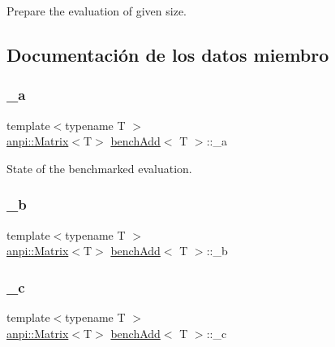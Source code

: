 Prepare the evaluation of given size. 



\subsection{Documentación de los datos miembro}
\mbox{\label{classbenchAdd_a133822bc19df3f71f9635d6e368ee592}} 
\subsubsection{\texorpdfstring{\+\_\+a}{\_a}}
{\footnotesize\ttfamily template$<$typename T $>$ \\
\hyperlink{classanpi_1_1Matrix}{anpi\+::\+Matrix}$<$T$>$ \hyperlink{classbenchAdd}{bench\+Add}$<$ T $>$\+::\+\_\+a\hspace{0.3cm}{\ttfamily [protected]}}



State of the benchmarked evaluation. 

\mbox{\label{classbenchAdd_a334aa4e387cd9964869af2a6f53882b1}} 
\subsubsection{\texorpdfstring{\+\_\+b}{\_b}}
{\footnotesize\ttfamily template$<$typename T $>$ \\
\hyperlink{classanpi_1_1Matrix}{anpi\+::\+Matrix}$<$T$>$ \hyperlink{classbenchAdd}{bench\+Add}$<$ T $>$\+::\+\_\+b\hspace{0.3cm}{\ttfamily [protected]}}

\mbox{\label{classbenchAdd_a4f13657c7fb6a5d2f66ef0c9a9613005}} 
\subsubsection{\texorpdfstring{\+\_\+c}{\_c}}
{\footnotesize\ttfamily template$<$typename T $>$ \\
\hyperlink{classanpi_1_1Matrix}{anpi\+::\+Matrix}$<$T$>$ \hyperlink{classbenchAdd}{bench\+Add}$<$ T $>$\+::\+\_\+c\hspace{0.3cm}{\ttfamily [protected]}}

